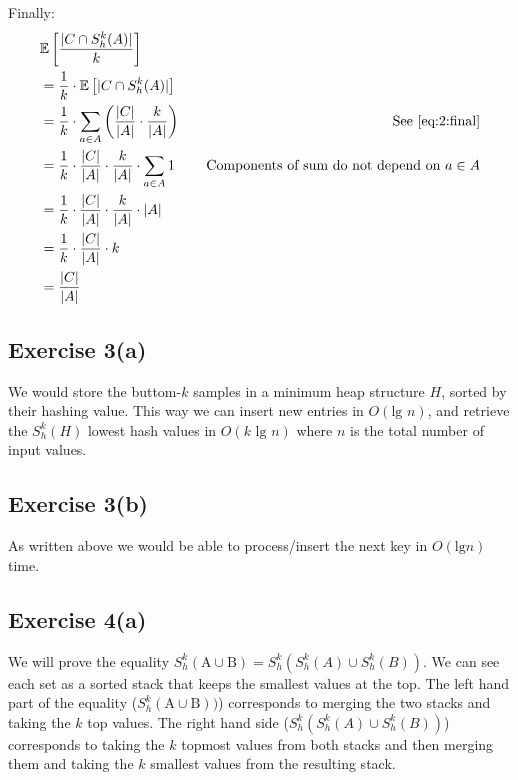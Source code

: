 Finally:
\begin{align*}
  & \mathbb{E}\left[ \frac{| C \cap S_h^k(A) |}{k}\right] & \\
  &= \frac{1}{k} \cdot \mathbb{E}\left[ | C \cap S_h^k(A) |\right] & \\
  &= \frac{1}{k} \cdot \sum_{a\in A} \left( \frac{|C|}{|A|} \cdot \frac{k}{|A|} \right) 
    & \quad \text{See \eqref{eq:2:final}} \\
  &= \frac{1}{k} \cdot \frac{|C|}{|A|} \cdot \frac{k}{|A|} \cdot \sum_{a\in A} 1
    & \quad \text{Components of sum do not depend on $a\in A$} \\
  &= \frac{1}{k} \cdot \frac{|C|}{|A|} \cdot \frac{k}{|A|} \cdot |A| & \\
  &= \frac{1}{k} \cdot \frac{|C|}{|A|} \cdot k & \\
  &= \frac{|C|}{|A|}
\end{align*}

\subsection{Exercise 3(a)}
\label{sec:ex3a}
We would store the buttom-$k$ samples in a minimum heap structure $H$, sorted by
their hashing value. This way we can insert new entries in $O(\text{lg } n)$,
and retrieve the $S^{k}_{h}(H)$ lowest hash values in $O(k \text{ lg } n)$ where
$n$ is the total number of input values.

\subsection{Exercise 3(b)}
As written above we would be able to process/insert the next key in $O(\text{lg
} n)$ time.

\subsection{Exercise 4(a)}
We will prove the equality $S^{k}_{h}(\text{A} \cup \text{B}) =
S^{k}_{h}(S^{k}_{h}(A) \cup S^{k}_{h}(B))$.
%
We can see each set as a sorted stack that keeps the smallest values at the
top. The left hand part of the equality ($S^{k}_{h}(\text{A} \cup \text{B}))$)
corresponds to merging the two stacks and taking the $k$ top values.
%
The right hand side ($S^{k}_{h}(S^{k}_{h}(A) \cup S^{k}_{h}(B))$) corresponds to
taking the $k$ topmost values from both stacks and then merging them and taking
the $k$ smallest values from the resulting stack.

